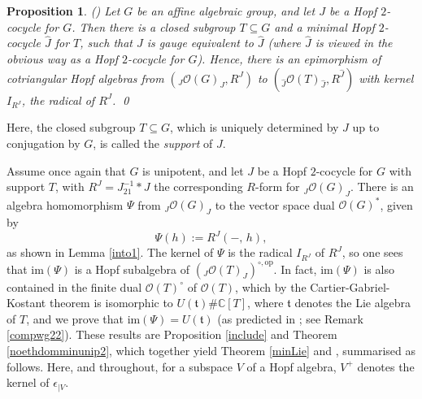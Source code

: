\documentclass{amsart}
\numberwithin{equation}{section}
\newtheorem{proposition}[theorem]{Proposition}
\theoremstyle{definition}
\begin{document}
\begin{proposition}{\rm (\cite[Theorem 3.1]{G1})}
Let $G$ be an affine algebraic group, and let  
$J$ be a Hopf $2$-cocycle for $G$. Then there is a closed subgroup $T\subseteq G$ and a minimal Hopf $2$-cocycle $\widehat{J}$ for $T$, such that $J$ is gauge equivalent to $\widehat{J}$ (where $\widehat{J}$ is viewed in the obvious way as a Hopf $2$-cocycle for $G$). Hence, there is an epimorphism of cotriangular Hopf algebras from $({}_J\mathcal{O}(G)_J,R^J)$ to $({}_{\widehat{J}}\mathcal{O}(T)_{\widehat{J}},R^{\widehat{J}})$ with kernel $I_{R^{J}}$, the radical of $R^J$. \qed
\end{proposition}

Here, the closed subgroup $T\subseteq G$, which is uniquely determined by $J$ up to conjugation by $G$, is called the \emph{support} of $J$.

Assume once again that $G$ is unipotent, and let $J$ be a Hopf $2$-cocycle for $G$ with support $T$, with $R^J = J_{21}^{-1}\ast J$ the corresponding $R$-form for ${}_J\mathcal{O}(G)_J$. There is an algebra homomorphism $\Psi$  from ${}_J\mathcal{O}(G)_J$ to the vector space dual $\mathcal{O}(G)^{\ast}$, given by 
$$ \Psi (h):= R^J(-,\, h), $$
as shown in Lemma \ref{into1}. The kernel of $\Psi$ is the radical $I_{R^J}$ of $R^J$, so one sees that $\mathrm{im}(\Psi)$ is a Hopf subalgebra of $({}_J\mathcal{O}(T)_J)^{\circ,\mathrm{op}}$. In fact, $\mathrm{im}(\Psi)$ is also contained in the finite dual $\mathcal{O}(T)^{\circ}$ of $\mathcal{O}(T)$, which by the Cartier-Gabriel-Kostant theorem is isomorphic to $U(\mathfrak{t})\# \mathbb{C}[T]$, where $\mathfrak{t}$ denotes the Lie algebra of $T$, and we prove that $\mathrm{im}(\Psi) = U(\mathfrak{t})$ 
(as predicted in \cite[Theorem 3.4]{G2}; see Remark \ref{compwg22}). These results are Proposition  \ref{include} and Theorem \ref{noethdomminunip2}, which together yield Theorem \ref{minLie} and \cite[Lemma 3.7, Theorems 3.5, 3.8]{G2}, summarised as follows. Here, and throughout, for a subspace $V$ of a Hopf algebra, $V^+$ denotes the kernel of $\epsilon_{\mid V}$.
\end{document}
